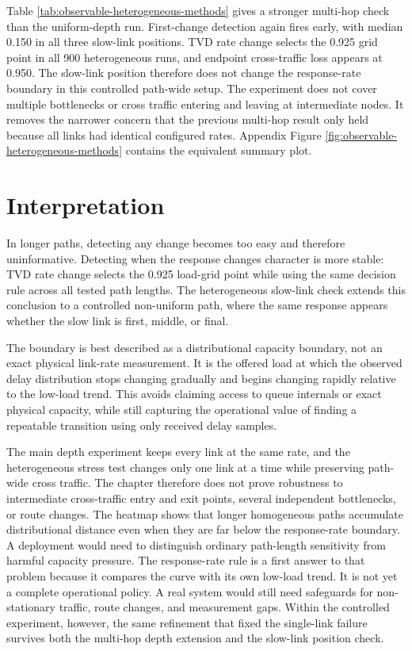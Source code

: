 \documentclass[a4paper,11pt]{report}
\begin{document}
Table \ref{tab:observable-heterogeneous-methods} gives a stronger multi-hop check than the uniform-depth run. First-change detection again fires early, with median 0.150 in all three slow-link positions. TVD rate change selects the 0.925 grid point in all 900 heterogeneous runs, and endpoint cross-traffic loss appears at 0.950. The slow-link position therefore does not change the response-rate boundary in this controlled path-wide setup. The experiment does not cover multiple bottlenecks or cross traffic entering and leaving at intermediate nodes. It removes the narrower concern that the previous multi-hop result only held because all links had identical configured rates. Appendix Figure \ref{fig:observable-heterogeneous-methods} contains the equivalent summary plot.

\section{Interpretation}

In longer paths, detecting any change becomes too easy and therefore uninformative. Detecting when the response changes character is more stable: TVD rate change selects the 0.925 load-grid point while using the same decision rule across all tested path lengths. The heterogeneous slow-link check extends this conclusion to a controlled non-uniform path, where the same response appears whether the slow link is first, middle, or final.

The boundary is best described as a distributional capacity boundary, not an exact physical link-rate measurement. It is the offered load at which the observed delay distribution stops changing gradually and begins changing rapidly relative to the low-load trend. This avoids claiming access to queue internals or exact physical capacity, while still capturing the operational value of finding a repeatable transition using only received delay samples.

The main depth experiment keeps every link at the same rate, and the heterogeneous stress test changes only one link at a time while preserving path-wide cross traffic. The chapter therefore does not prove robustness to intermediate cross-traffic entry and exit points, several independent bottlenecks, or route changes. The heatmap shows that longer homogeneous paths accumulate distributional distance even when they are far below the response-rate boundary. A deployment would need to distinguish ordinary path-length sensitivity from harmful capacity pressure. The response-rate rule is a first answer to that problem because it compares the curve with its own low-load trend. It is not yet a complete operational policy. A real system would still need safeguards for non-stationary traffic, route changes, and measurement gaps. Within the controlled experiment, however, the same refinement that fixed the single-link failure survives both the multi-hop depth extension and the slow-link position check.
\end{document}
